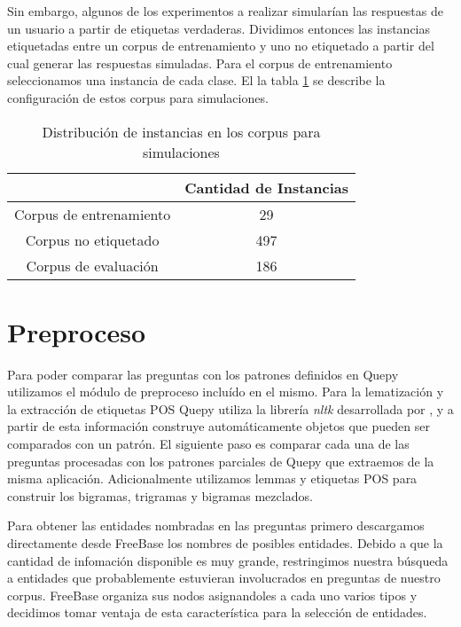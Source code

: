 Sin embargo, algunos de los experimentos a realizar simularían las respuestas de un usuario a partir de etiquetas verdaderas. Dividimos entonces las instancias etiquetadas entre un corpus de entrenamiento y uno no etiquetado a partir del cual generar las respuestas simuladas. Para el corpus de entrenamiento seleccionamos una instancia de cada clase. El la tabla \ref{corpus-para-simulacion} se describe la configuración de estos corpus para simulaciones.


\begin{table}[h!]\label{corpus-para-simulacion}
\centering
\begin{tabular}{c c}
     & Cantidad de Instancias\\ [0.5ex]
    \hline
    Corpus de entrenamiento & 29 \\ [0.5ex]
    Corpus no etiquetado & 497 \\ [0.5ex]
    Corpus de evaluación & 186 \\[1ex]
    \hline
\end{tabular}
\caption{Distribución de instancias en los corpus para simulaciones}
\end{table}

\section{Preproceso}

Para poder comparar las preguntas con los patrones definidos en Quepy utilizamos el módulo de preproceso incluído en el mismo. Para la lematización y la extracción de etiquetas POS Quepy utiliza la librería \textit{nltk} desarrollada por \citet{nltk}, y a partir de esta información construye automáticamente objetos que pueden ser comparados con un patrón. El siguiente paso es comparar cada una de las preguntas procesadas con los patrones parciales de Quepy que extraemos de la misma aplicación. Adicionalmente utilizamos lemmas y etiquetas POS para construir los bigramas, trigramas y bigramas mezclados.

Para obtener las entidades nombradas en las preguntas primero descargamos directamente desde FreeBase los nombres de posibles entidades. Debido a que la cantidad de infomación disponible es muy grande, restringimos nuestra búsqueda a entidades que probablemente estuvieran involucrados en preguntas de nuestro corpus. FreeBase organiza sus nodos asignandoles a cada uno varios tipos y decidimos tomar ventaja de esta característica para la selección de entidades.

